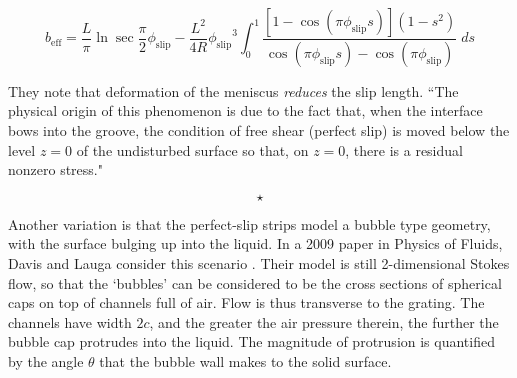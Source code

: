 \documentclass[a4paper]{report}
\newcommand{\beff}{\ensuremath{b_{\mathrm{eff}}}}
\newcommand{\phislip}{\ensuremath{\phi_{\mathrm{slip}}}}
\newcommand{\sep}{\begin{equation*} \star \end{equation*}}
\begin{document}
\[ \beff= \frac{L}{\pi}	\ln \sec \frac{\pi}{2} \phislip - \frac{L^2}{4R}\phislip^3 \int_0^1 
\frac{[1-\cos(\pi\phislip s)] (1-s^2) }{\cos(\pi\phislip s) - \cos(\pi\phislip)}
\; ds \]

They note that deformation of the meniscus \emph{reduces} the slip length. ``The physical origin of this phenomenon is due to the fact that, when the interface bows into the groove, the condition of free shear (perfect slip) is moved below the level $z=0$ of the undisturbed surface so that, on $z=0$, there is a residual nonzero stress."

\begin{center}
\end{center}

\sep

Another variation is that the perfect-slip strips model a bubble type geometry, with the surface bulging up into the liquid.  In a 2009 paper in Physics of Fluids, Davis and Lauga consider this scenario \cite{DavisLauga2009a}.  Their model is still 2-dimensional Stokes flow, so that the `bubbles' can be considered to be the cross sections of spherical caps on top of channels full of air. Flow is thus transverse to the grating.  The channels have width $2c$, and the greater the air pressure therein, the further the bubble cap protrudes into the liquid.  The magnitude of protrusion is quantified by the angle $\theta$ that the bubble wall makes to the solid surface.
\end{document}
